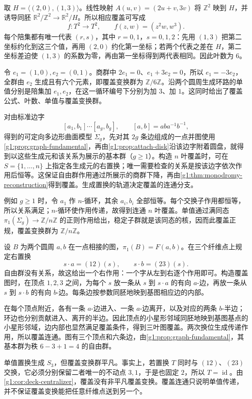\begin{example}\label{g1:exm:torus-six-cover}
	取 \(H=\langle(2,0),(1,3)\rangle\)。线性映射 \(A(u,v)=(2u+v,3v)\) 将 \(\mathbb Z^2\) 映到 \(H\)，并诱导同胚 \(\mathbb R^2/\mathbb Z^2\rightarrow\mathbb R^2/H\)。所以相应覆盖可写成
	\[
		f:T^2\longrightarrow T^2,\qquad f(z,w)=(z^2w,w^3).
	\]
	每个陪集都有唯一代表 \((r,s)\)，其中 \(r=0,1\)，\(s=0,1,2\)：先用 \((1,3)\) 把第二坐标约化到这三个值，再用 \((2,0)\) 约化第一坐标；若两个代表之差在 \(H\)，第二坐标差迫使 \((1,3)\) 的系数为零，再由第一坐标得到两代表相同。因此叶数为 \(6\)。

	令 \(e_1=(1,0),e_2=(0,1)\)。商群中 \(2e_1=0\)、\(e_1+3e_2=0\)，所以 \(e_1=-3e_2\)，全群由 \(e_2\) 生成且有六个元素，即覆盖变换群为 \(\mathbb Z/6\mathbb Z\)。沿两个圆周生成环路的单值分别是陪集加 \(e_1,e_2\)，在这一循环编号下分别为加 \(3\)、加 \(1\)。这同时给出了覆盖公式、叶数、单值与覆盖变换群。
\end{example}

对由标准边字
\[
	[a_1,b_1]\cdots[a_g,b_g],\qquad [a,b]=aba^{-1}b^{-1},
\]
得到的可定向多边形曲面模型 \(\Sigma_g\)，先对其 \(2g\) 条边组成的一点并图使用\cref{g1:prop:graph-fundamental}，再由\cref{g1:prop:attach-disk}沿该边字附着圆盘，就得到以这些生成元和该关系为展示的基本群（\(g\ge1\)）。构造 \(n\) 叶覆盖时，可在 \(S=\{1,\ldots,n\}\) 上指定各生成元的右置换；唯一需要检查的关系是按该边字依次作用后恒等。这保证自由群作用通过所展示的商群下降，再由\cref{g1:thm:monodromy-reconstruction}得到覆盖。生成置换的轨道决定覆盖的连通分支。

例如 \(g\ge1\) 时，令 \(a_1\) 作 \(n\)-循环，其余 \(a_i,b_i\) 全部恒等。每个交换子作用都恒等，所以关系满足；\(n\)-循环使作用传递，故得到连通 \(n\) 叶覆盖。单值通过满同态 \(\pi_1(\Sigma_g)\rightarrow\mathbb Z/n\mathbb Z\) 的正则作用给出，稳定子群就是该同态的核，因而此覆盖正规，覆盖变换群为 \(\mathbb Z/n\mathbb Z\)。

\begin{example}\label{g1:exm:three-sheet-graph}
	设 \(B\) 为两个圆周 \(a,b\) 在一点相接的图，\(\pi_1(B)=F(a,b)\)。在三个纤维点上规定右置换
	\[
		s\cdot a=(12)(s),\qquad s\cdot b=(23)(s).
	\]
	自由群没有关系，故这给出一个右作用：一个字从左到右逐个作用即可。构造覆盖图时，在顶点 \(1,2,3\) 之间，为每个 \(s\) 放一条从 \(s\) 到 \(s\cdot a\) 的有向 \(a\)-边，再放一条从 \(s\) 到 \(s\cdot b\) 的有向 \(b\)-边。每条边按参数同胚地映到基图相应边的内部。

	在每个顶点附近，各有一条 \(a\)-边进入、一条 \(a\)-边离开，以及对应的两条 \(b\)-半边；环边也分别贡献进入、离开的半边。因此顶点的小星形邻域同胚地映到基图基点的小星形邻域，边内部也显然满足覆盖条件，得到三叶图覆盖。两次换位生成传递作用，所以覆盖连通。图有三个顶点和六条边，由\cref{g1:prop:graph-fundamental}，其基本群为秩 \(6-3+1=4\) 的自由群。

	单值置换生成 \(S_3\)，但覆盖变换群平凡。事实上，若置换 \(T\) 同时与 \((12)\)、\((23)\) 交换，它必须分别保留二者唯一的不动点 \(3,1\)，于是也固定 \(2\)，所以 \(T=\operatorname{id}\)。由\cref{g1:cor:deck-centralizer}，覆盖没有非平凡覆盖变换。覆盖连通只说明单值传递，并不保证覆盖变换能把任意纤维点送到另一个。
\end{example}

